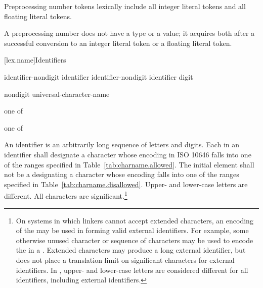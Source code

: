 \pnum
Preprocessing number tokens lexically include all integer literal
tokens and all floating literal
tokens.

\pnum
A preprocessing number does not have a type or a value; it acquires both
after a successful conversion to an integer literal token or a floating literal
token.%

[lex.name]{Identifiers}

%
\begin{bnf}
\br
    identifier-nondigit\br
    identifier identifier-nondigit\br
    identifier digit
\end{bnf}

\begin{bnf}
\br
    nondigit\br
    universal-character-name
\end{bnf}

\begin{bnf}
 \textnormal{one of}\br
    \br
    \br
    \br
\end{bnf}

\begin{bnf}
 \textnormal{one of}\br
\end{bnf}

\pnum
{}%
%
An identifier is an arbitrarily long sequence of letters and digits.
Each  in an identifier shall designate a
character whose encoding in ISO 10646 falls into one of the ranges
specified in Table~\ref{tab:charname.allowed}.
The initial element shall not be a 
designating a character whose encoding falls into one of the ranges
specified in Table~\ref{tab:charname.disallowed}.
Upper- and lower-case letters are
different. All characters are significant.\footnote{On systems in which linkers cannot accept extended
characters, an encoding of the  may be used in
forming valid external identifiers. For example, some otherwise unused
character or sequence of characters may be used to encode the
 in a . Extended
characters may produce a long external identifier, but \Cpp does not
place a translation limit on significant characters for external
identifiers. In \Cpp, upper- and lower-case letters are considered
different for all identifiers, including external identifiers. }

